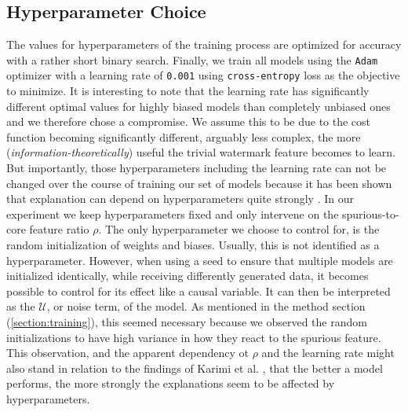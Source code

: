 \subsection{Hyperparameter Choice}
The values for hyperparameters of the training process are optimized for accuracy with a rather short binary search. Finally, we train all models using the \verb|Adam| optimizer with a learning rate of \verb|0.001| using \verb|cross-entropy| loss as the objective to minimize. 
It is interesting to note that the learning rate has significantly different optimal values for highly biased models than completely unbiased ones and we therefore chose a compromise. We assume this to be due to the cost function becoming significantly different, arguably less complex, the more (\textit{information-theoretically}) useful the trivial watermark feature becomes to learn.
But importantly, those hyperparameters including the learning rate can not be changed over the course of training our set of models because it has been shown that explanation can depend on hyperparameters quite strongly \cite{Karimi2023}.
In our experiment we keep hyperparameters fixed and only intervene on the spurious-to-core feature ratio $\rho$. The only hyperparameter we choose to control for, is the random initialization of weights and biases. Usually, this is not identified as a hyperparameter. However, when using a seed to ensure that multiple models are initialized identically, while receiving differently generated data, it becomes possible to control for its effect like a causal variable. It can then be interpreted as the $\mathcal{U}$, or noise term, of the model.
As mentioned in the method section (\ref{section:training}), this seemed necessary because we observed the random initializations to have high variance in how they react to the spurious feature. This observation, and the apparent dependency ot $\rho$ and the learning rate might also stand in relation to the findings of Karimi et al. \cite{Karimi2023}, that the better a model performs, the more strongly the explanations seem to be affected by hyperparameters.


